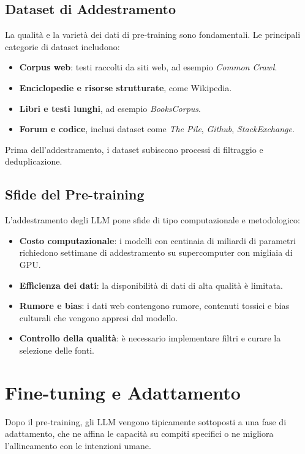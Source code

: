 \subsection{Dataset di Addestramento}
La qualità e la varietà dei dati di pre-training sono fondamentali. Le principali categorie di dataset includono:
\begin{itemize}
    \item \textbf{Corpus web}: testi raccolti da siti web, ad esempio \textit{Common Crawl}.
    \item \textbf{Enciclopedie e risorse strutturate}, come Wikipedia.
    \item \textbf{Libri e testi lunghi}, ad esempio \textit{BooksCorpus}.
    \item \textbf{Forum e codice}, inclusi dataset come \textit{The Pile}, \textit{Github}, \textit{StackExchange}.
\end{itemize}
Prima dell'addestramento, i dataset subiscono processi di filtraggio e deduplicazione.

\subsection{Sfide del Pre-training}
L'addestramento degli LLM pone sfide di tipo computazionale e metodologico:
\begin{itemize}
    \item \textbf{Costo computazionale}: i modelli con centinaia di miliardi di parametri richiedono settimane di addestramento su supercomputer 
    con migliaia di GPU.
    \item \textbf{Efficienza dei dati}: la disponibilità di dati di alta qualità è limitata.
    \item \textbf{Rumore e bias}: i dati web contengono rumore, contenuti tossici e bias culturali che vengono appresi dal modello.
    \item \textbf{Controllo della qualità}: è necessario implementare filtri e curare la selezione delle fonti.
\end{itemize}

\newpage
\section{Fine-tuning e Adattamento}

Dopo il pre-training, gli LLM vengono tipicamente sottoposti a una fase di adattamento, che ne affina le capacità su compiti specifici o 
ne migliora l'allineamento con le intenzioni umane.

